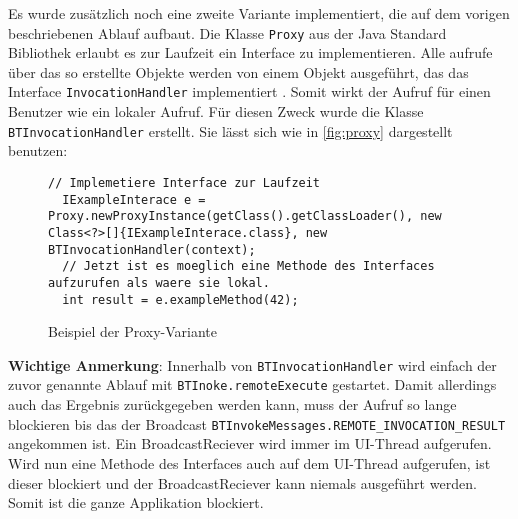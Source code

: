 Es wurde zusätzlich noch eine zweite Variante implementiert, die auf dem vorigen beschriebenen Ablauf aufbaut. Die Klasse \lstinline{Proxy} aus der Java Standard Bibliothek erlaubt es zur Laufzeit ein Interface zu implementieren. Alle aufrufe über das so erstellte Objekte werden von einem Objekt ausgeführt, das das Interface \lstinline{InvocationHandler} implementiert \cite{dpunkt2002}. Somit wirkt der Aufruf für einen Benutzer wie ein lokaler Aufruf. Für diesen Zweck wurde die Klasse \lstinline{BTInvocationHandler} erstellt. Sie lässt sich wie in \autoref{fig:proxy} dargestellt benutzen:
\begin{figure}[hbtp]
  \begin{lstlisting}[basicstyle=\ttfamily\scriptsize]
  // Implemetiere Interface zur Laufzeit
  IExampleInterace e = Proxy.newProxyInstance(getClass().getClassLoader(), new Class<?>[]{IExampleInterace.class}, new BTInvocationHandler(context);
  // Jetzt ist es moeglich eine Methode des Interfaces aufzurufen als waere sie lokal.
  int result = e.exampleMethod(42);
  \end{lstlisting}
  \caption{Beispiel der Proxy-Variante}
  \label{fig:proxy}
\end{figure}
\begin{sloppypar}
\textbf{Wichtige Anmerkung}: Innerhalb von \lstinline{BTInvocationHandler} wird einfach der zuvor genannte Ablauf mit \lstinline{BTInoke.remoteExecute} gestartet. Damit allerdings auch das Ergebnis zurückgegeben werden kann, muss der Aufruf so lange blockieren bis das der Broadcast \lstinline{BTInvokeMessages.REMOTE_INVOCATION_RESULT} angekommen ist. Ein BroadcastReciever wird immer im UI-Thread aufgerufen. Wird nun eine Methode des Interfaces auch auf dem UI-Thread aufgerufen, ist dieser blockiert und der BroadcastReciever kann niemals ausgeführt werden. Somit ist die ganze Applikation blockiert.
\end{sloppypar}
